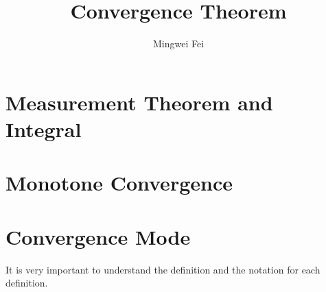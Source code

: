 \documentclass[11pt]{article} %
\title{Convergence Theorem}
\author{Mingwei Fei}
\begin{document}
\maketitle

\section{Measurement Theorem and Integral}


\section{Monotone Convergence}

\section{Convergence Mode}
It is very important to understand the definition and the notation for each definition.
\end{document}
